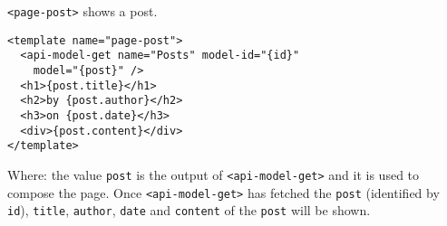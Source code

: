 \vspace{0.2cm}

\texttt{<page-post>} shows a post. 

\begin{lstlisting}[language=HTML5]
<template name="page-post">
  <api-model-get name="Posts" model-id="{id}" 
    model="{post}" />
  <h1>{post.title}</h1>
  <h2>by {post.author}</h2>
  <h3>on {post.date}</h3>
  <div>{post.content}</div>
</template>
\end{lstlisting}

Where:
the value \texttt{post} is the output of \texttt{<api-model-get>} and it is used to compose the page.
Once \texttt{<api-model-get>} has fetched the \texttt{post} (identified by \texttt{id}),
\texttt{title}, \texttt{author}, \texttt{date} and \texttt{content} of the \texttt{post} will be shown.
